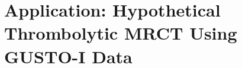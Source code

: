 \documentclass[AMA,Times1COL]{WileyNJDv5}
\begin{document}





\section{Application: Hypothetical Thrombolytic MRCT Using GUSTO-I Data}\label{sec:application}
\end{document}

